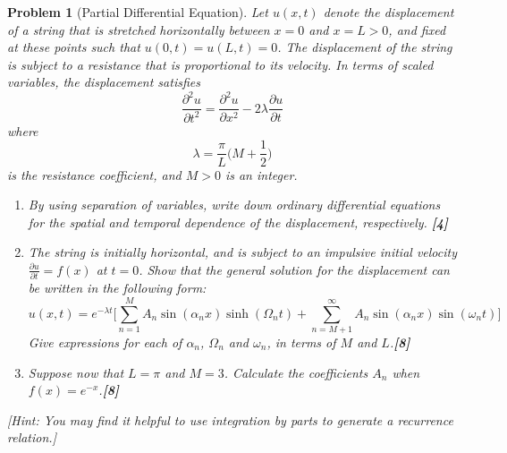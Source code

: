 \documentclass[a4paper]{article}
\theoremstyle{new}
\newtheorem{qns}{Problem}[section]
\begin{document}
\begin{qns}[Partial Differential Equation]
Let $u(x, t)$ denote the displacement of a string that is stretched horizontally between $x = 0$ and $x = L > 0$, and fixed at these points such that $u(0, t) = u(L, t) = 0$. The displacement of the string is subject to a resistance that is proportional to its velocity. In terms of scaled variables, the displacement satisfies
$$\frac{\partial^2u}{\partial t^2}=\frac{\partial^2u}{\partial x^2}-2\lambda\frac{\partial u}{\partial t}$$
where
$$\lambda=\frac{\pi}{L}\bigg(M+\frac{1}{2}\bigg)$$
is the resistance coefficient, and $M > 0$ is an integer.
\begin{enumerate}[label=(\alph*)]
\item By using separation of variables, write down ordinary differential equations for the spatial and temporal dependence of the displacement, respectively. \hfill\textbf{[4]}
\item The string is initially horizontal, and is subject to an impulsive initial velocity $\frac{\partial u}{\partial t}=f(x)$ at $t = 0$. Show that the general solution for the displacement can be written in the following form:
$$u(x,t)=e^{-\lambda t}\bigg[\sum_{n=1}^MA_n\sin(\alpha_n x)\sinh(\Omega_nt)+\sum_{n=M+1}^\infty A_n\sin(\alpha_nx)\sin(\omega_nt)\bigg]$$
Give expressions for each of $\alpha_n$, $\Omega_n$ and $\omega_n$, in terms of $M$ and $L$.\hfill\textbf{[8]}
\item Suppose now that $L = \pi$ and $M = 3$. Calculate the coefficients $A_n$ when $f(x) = e^{−x}$.\hfill\textbf{[8]}
\end{enumerate}
[Hint: You may find it helpful to use integration by parts to generate a recurrence relation.] 
\end{qns}
\end{document}
